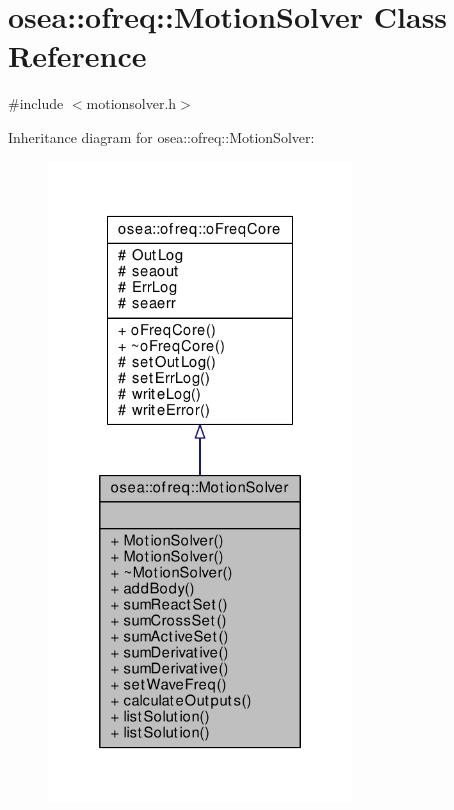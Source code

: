 \hypertarget{classosea_1_1ofreq_1_1_motion_solver}{\section{osea\-:\-:ofreq\-:\-:Motion\-Solver Class Reference}
\label{classosea_1_1ofreq_1_1_motion_solver}
}


{\ttfamily \#include $<$motionsolver.\-h$>$}



Inheritance diagram for osea\-:\-:ofreq\-:\-:Motion\-Solver\-:
\nopagebreak
\begin{figure}[H]
\begin{center}
\leavevmode
\includegraphics[width=228pt]{classosea_1_1ofreq_1_1_motion_solver__inherit__graph}
\end{center}
\end{figure}
